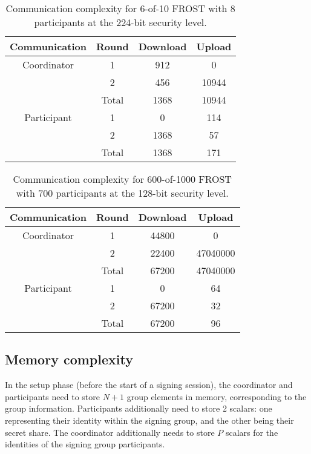 \begin{table}
	\centering
	\begin{tabular}{c c c c}
		\toprule
		Communication & Round & Download & Upload \\ \midrule
		Coordinator & 1 & 912 & 0 \\
		            & 2 & 456 & 10944 \\
		            & Total & 1368 & 10944 \\
		\midrule
		Participant & 1 & 0 & 114 \\
		            & 2 & 1368 & 57 \\
		            & Total & 1368 & 171 \\
		\bottomrule
	\end{tabular}
	\caption{Communication complexity for 6-of-10 FROST with 8 participants at the 224-bit security level.}
\end{table}

\begin{table}
	\centering
	\begin{tabular}{c c c c}
		\toprule
		Communication & Round & Download & Upload \\ \midrule
		Coordinator & 1 & 44800 & 0 \\
		            & 2 & 22400 & 47040000 \\
		            & Total & 67200 & 47040000 \\
		\midrule
		Participant & 1 & 0 & 64 \\
		            & 2 & 67200 & 32 \\
		            & Total & 67200 & 96 \\
		\bottomrule
	\end{tabular}
	\caption{Communication complexity for 600-of-1000 FROST with 700 participants at the 128-bit security level.}
\end{table}

\subsection{Memory complexity}

In the setup phase (before the start of a signing session), the coordinator and
participants need to store $N + 1$ group elements in memory, corresponding to
the group information. Participants additionally need to store 2 scalars: one
representing their identity within the signing group, and the other being their
secret share. The coordinator additionally needs to store $P$ scalars for the
identities of the signing group participants.

